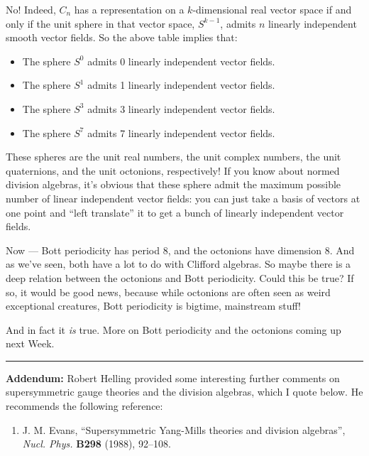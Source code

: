 \documentclass{article}
\def\tightlist{}
\begin{document}
No! Indeed, \(C_n\) has a representation on a \(k\)-dimensional real
vector space if and only if the unit sphere in that vector space,
\(S^{k-1}\), admits \(n\) linearly independent smooth vector fields. So
the above table implies that:

\begin{itemize}
\tightlist
\item
  The sphere \(S^0\) admits 0 linearly independent vector fields.
\item
  The sphere \(S^1\) admits 1 linearly independent vector fields.
\item
  The sphere \(S^3\) admits 3 linearly independent vector fields.
\item
  The sphere \(S^7\) admits 7 linearly independent vector fields.
\end{itemize}

These spheres are the unit real numbers, the unit complex numbers, the
unit quaternions, and the unit octonions, respectively! If you know
about normed division algebras, it's obvious that these sphere admit the
maximum possible number of linear independent vector fields: you can
just take a basis of vectors at one point and ``left translate'' it to
get a bunch of linearly independent vector fields.

Now --- Bott periodicity has period 8, and the octonions have dimension
8. And as we've seen, both have a lot to do with Clifford algebras. So
maybe there is a deep relation between the octonions and Bott
periodicity. Could this be true? If so, it would be good news, because
while octonions are often seen as weird exceptional creatures, Bott
periodicity is bigtime, mainstream stuff!

And in fact it \emph{is} true. More on Bott periodicity and the
octonions coming up next Week.

\begin{center}\rule{0.5\linewidth}{0.5pt}\end{center}

\textbf{Addendum:} Robert Helling provided some interesting further
comments on supersymmetric gauge theories and the division algebras,
which I quote below. He recommends the following reference:

\begin{enumerate}
\def\labelenumi{\arabic{enumi})}
\setcounter{enumi}{5}
\tightlist
\item
  J. M. Evans, ``Supersymmetric Yang-Mills theories and division
  algebras'', \emph{Nucl. Phys.} \textbf{B298} (1988), 92--108.
\end{enumerate}
\end{document}

